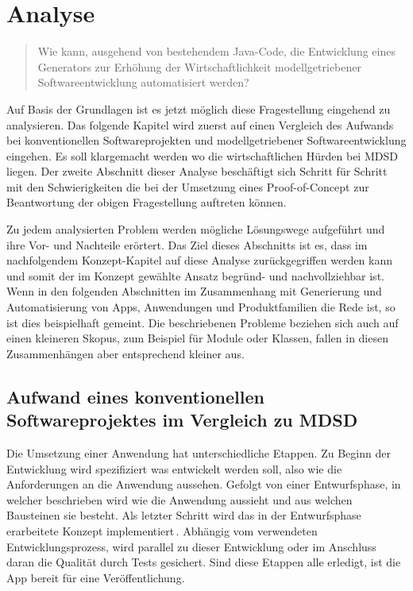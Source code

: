\documentclass[12pt,oneside,a4paper,parskip]{scrbook}
\begin{document}
\chapter{Analyse}

\begin{quote}\glqq Wie kann, ausgehend von bestehendem Java-Code, die Entwicklung eines Generators zur Erhöhung der Wirtschaftlichkeit modellgetriebener Softwareentwicklung automatisiert werden?\grqq \end{quote}

Auf Basis der Grundlagen ist es jetzt möglich diese Fragestellung eingehend zu analysieren. Das folgende Kapitel wird zuerst auf einen Vergleich des Aufwands bei konventionellen Softwareprojekten und modellgetriebener Softwareentwicklung eingehen. Es soll klargemacht werden wo die wirtschaftlichen Hürden bei MDSD liegen. Der zweite Abschnitt dieser Analyse beschäftigt sich Schritt für Schritt mit den Schwierigkeiten die bei der Umsetzung eines Proof-of-Concept zur Beantwortung der obigen Fragestellung auftreten können.

Zu jedem analysierten Problem werden mögliche Lösungswege aufgeführt und ihre Vor- und Nachteile erörtert. Das Ziel dieses Abschnitts ist es, dass im nachfolgendem Konzept-Kapitel auf diese Analyse zurückgegriffen werden kann und somit der im Konzept gewählte Ansatz begründ- und nachvollziehbar ist. Wenn in den folgenden Abschnitten im Zusammenhang mit Generierung und Automatisierung von Apps, Anwendungen und Produktfamilien die Rede ist, so ist dies beispielhaft gemeint. Die beschriebenen Probleme beziehen sich auch auf einen kleineren Skopus, zum Beispiel für Module oder Klassen, fallen in diesen Zusammenhängen aber entsprechend kleiner aus.

\section{Aufwand eines konventionellen Softwareprojektes im Vergleich zu MDSD}

Die Umsetzung einer Anwendung hat unterschiedliche Etappen. Zu Beginn der Entwicklung wird spezifiziert was entwickelt werden soll, also wie die Anforderungen an die Anwendung aussehen. Gefolgt von einer Entwurfsphase, in welcher beschrieben wird wie die Anwendung aussieht und aus welchen Bausteinen sie besteht. Als letzter Schritt wird das in der Entwurfsphase erarbeitete Konzept implementiert\,\cite[S. 62]{balzert2009a}. Abhängig vom verwendeten Entwicklungsprozess, wird parallel zu dieser Entwicklung oder im Anschluss daran die Qualität durch Tests gesichert. Sind diese Etappen alle erledigt, ist die App bereit für eine Veröffentlichung.
\end{document}
